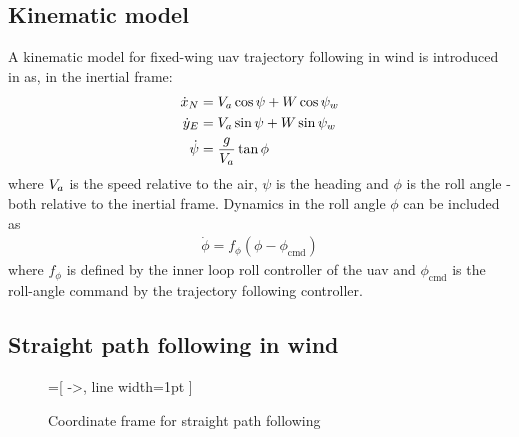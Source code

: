 \subsection{Kinematic model}
A kinematic model for fixed-wing \ac{uav} trajectory following in wind is introduced in \cite{uav_dynamics_wind} as, in the inertial frame:
\begin{align}\label{eq:traj_model}
    \dot{x}_N &= V_a\cos\psi + W\cos\psi_w \\
    \dot{y}_E &= V_a\sin\psi + W\sin\psi_w \\
    \dot{\psi} &= \frac{g}{V_a}\tan\phi
\end{align}
where $V_a$ is the speed relative to the air, $\psi$ is the heading and $\phi$ is the roll angle - both relative to the inertial frame.
Dynamics in the roll angle $\phi$ can be included as
\begin{align}
    \dot{\phi} = f_\phi(\phi-\phi_{\text{cmd}})
\end{align}
where $f_\phi$ is defined by the inner loop roll controller of the \ac{uav} and $\phi_{\text{cmd}}$ is the roll-angle command by the
trajectory following controller.

\subsection{Straight path following in wind}\label{sec:straight_path_wind}

\begin{figure}
    \begin{center}
        =[
            ->,
            line width=1pt
            ]
    \end{center}
    \caption{Coordinate frame for straight path following}
    \label{fig:coord_straight}
\end{figure}

